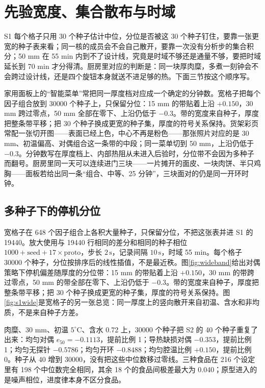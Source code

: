 \chapter{先验宽度、集合散布与时域}
\label{ch:wide}

S1 每个格子只用 30 个种子估计中位，分位是否被这 30 个种子钉住，要靠一张更宽的种子表来看；同一核的成员会不会自己散开，要靠一次没有分析步的集合积分；50 mm 在 55 min 内到不了设计线，究竟是时域不够还是通量不够，要把时域延长到 70 min 才分得清。厨房里对应的判断是：同一块厚肉糜，多煮一刻钟会不会跨过设计线，还是四个旋钮本身就送不进足够的热。下面三节按这个顺序写。

家用面板上的“智能菜单”常把同一厚度档对应成一个确定的分钟数。宽格子把每个因子组合放到 30000 个种子上，只保留分位：15 mm 的带贴着上沿 \(+0.150\)，30 mm 跨过零点，50 mm 全部在零下、上沿仍低于 \(-0.3\)。带的宽度来自种子，厚度把整条带平移；把 30 个种子换成更宽的种子集，厚度的符号关系保持。货架彩页常配一张切开图——表面已经上色，中心不再是粉色——那张照片对应的是 30 mm、初温偏高、对偶组合这一条带的中段；同一菜单切到 50 mm，上沿仍低于 \(-0.3\)。分钟数写在厚度档上、内部热阻从未进入后验时，分位带不会因为多种子而翻号。厨房里同一天可以连续进门三块——一片摊开的面皮、一块肉饼、半只鸡胸——面板若给出同一条“组合、中等、25 分钟”，三块面对的仍是同一开环时钟。

\section{多种子下的停机分位}

宽格子在 648 个因子组合上各积大量种子，只保留分位，不把这张表并进 S1 的 19440。放大使用与 19440 行相同的差分和相同的种子相位 \(1000+\mathrm{seed}+17\times\mathrm{proto}\)，步长 \(2\,\mathrm{s}\)，记录间隔 \(10\,\mathrm{s}\)，时域 55 min。每个格子 30000 个种子，分位按排序后的线性插值，不是最近秩。图\ref{fig:wideband}给出对偶策略下停机偏差随厚度的分位带：15 mm 的带贴着上沿 \(+0.150\)，30 mm 的带跨过零点，50 mm 的带全部在零下、上沿仍低于 \(-0.3\)。带的宽度来自种子，厚度把整条带平移；把 30 个种子换成更宽的种子集，厚度的符号关系保持。图\ref{fig:s1wide}是宽格子的另一张总览：同一厚度上的竖向散开来自初温、含水和非均质，不是来自种子方差。

肉糜、30 mm、初温 \(5^\circ\mathrm{C}\)、含水 0.72 上，30000 个种子把 S2 的 40 个种子重复了出来：均匀对偶 \(e_{50}=-0.1113\)，提前比例 1；导热缺损对偶 \(-0.353\)，提前比例 1；均匀无探针 \(-0.5786\)；均匀开环 \(-0.8488\)；均匀腔温比例 \(+0.150\)，提前比例 0。种子从 40 增到 30000，没有把这些中位数移过零线。三种食品在 216 个设定里有 198 个中位数完全相同，其余 18 个的食品间极差最大为 0.040；原型进入的是噪声相位，进度律本身不区分食品。

